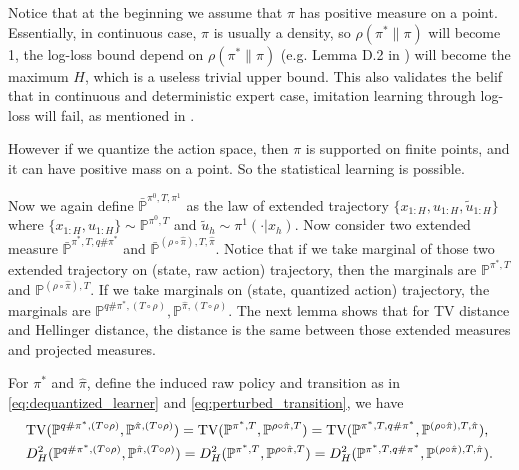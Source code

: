 \documentclass{article}
\begin{document}
\begin{remark}
Notice that at the beginning we assume that $\pi$ has positive measure on a point. Essentially, in continuous case, $\pi$ is usually a density, so $\rho(\pi^*\|\pi)$ will become 1, the log-loss bound depend on $\rho(\pi^*\|\pi)$ (e.g. Lemma D.2 in \citet{foster2024behavior}) will become the maximum $H$, which is a useless trivial upper bound. This also validates the belif that in continuous and deterministic expert case, imitation learning through log-loss will fail, as mentioned in \citet{simchowitz2025pitfalls}.

However if we quantize the action space, then $\pi$ is supported on finite points, and it can have positive mass on a point. So the statistical learning is possible.
\end{remark}


Now we again define $\bar{\mathbb P}^{\pi^0, T, \pi^1}$ as the law of extended trajectory $\{x_{1:H}, u_{1:H}, \tilde u_{1:H}\}$ where $\{x_{1:H}, u_{1:H}\}\sim \mathbb P^{\pi^0, T}$ and $\tilde u_h\sim \pi^1(\cdot|x_h)$. Now consider two extended measure $\bar{\mathbb P}^{\pi^*, T,q\#\pi^*}$ and $\bar {\mathbb P}^{(\rho \circ \hat \pi), T, \hat \pi}$. Notice that if we take marginal of those two extended trajectory on (state, raw action) trajectory, then the marginals are $\mathbb P^{\pi^*, T}$ and $\mathbb P^{(\rho \circ \hat \pi),T}$. If we take marginals on (state, quantized action) trajectory, the marginals are $\mathbb P^{q\#\pi^*, (T\circ \rho)},\mathbb P^{\hat \pi, (T\circ \rho)}$. The next lemma shows that for TV distance and Hellinger distance, the distance is the same between those extended measures and projected measures.

\begin{lemma}\label{lemma:r_and_q_are_inverse_on_expert}
For $\pi^*$ and $\hat \pi$, define the induced raw policy and transition as in \cref{eq:dequantized_learner} and \cref{eq:perturbed_transition}, we have 
    \begin{align*}
        &\textnormal{TV}(\mathbb P^{q\#\pi^*, (T\circ \rho)},\mathbb P^{\hat \pi, (T\circ \rho)})=\textnormal{TV}(\mathbb P^{\pi^*, T},\mathbb P^{\rho\circ \hat \pi,T})=\textnormal{TV}(\mathbb P^{\pi^*, T, q\#\pi^*},\mathbb P^{(\rho\circ \hat \pi), T, \hat \pi}),\\& D_H^2(\mathbb P^{q\#\pi^*, (T\circ \rho)},\mathbb P^{\hat \pi, (T\circ \rho)})=D_H^2(\mathbb P^{\pi^*, T},\mathbb P^{\rho\circ \hat \pi,T})=D_H^2(\mathbb P^{\pi^*, T, q\#\pi^*},\mathbb P^{(\rho\circ \hat \pi), T, \hat \pi}).
    \end{align*}
\end{lemma}
\end{document}
